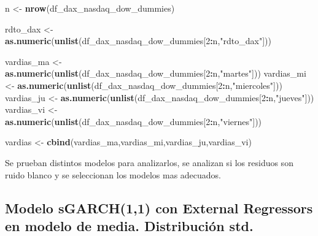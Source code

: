 \documentclass[
  11pt,
]{article}
\newenvironment{Shaded}{\begin{snugshade}}{\end{snugshade}}
\newcommand{\DecValTok}[1]{\textcolor[rgb]{0.00,0.00,0.81}{#1}}
\newcommand{\KeywordTok}[1]{\textcolor[rgb]{0.13,0.29,0.53}{\textbf{#1}}}
\newcommand{\NormalTok}[1]{#1}
\newcommand{\OperatorTok}[1]{\textcolor[rgb]{0.81,0.36,0.00}{\textbf{#1}}}
\newcommand{\StringTok}[1]{\textcolor[rgb]{0.31,0.60,0.02}{#1}}
\begin{document}
\begin{Shaded}
\begin{Highlighting}[]
\NormalTok{n <-}\StringTok{ }\KeywordTok{nrow}\NormalTok{(df_dax_nasdaq_dow_dummies)}

\NormalTok{rdto_dax <-}\StringTok{ }\KeywordTok{as.numeric}\NormalTok{(}\KeywordTok{unlist}\NormalTok{(df_dax_nasdaq_dow_dummies[}\DecValTok{2}\OperatorTok{:}\NormalTok{n,}\StringTok{"rdto_dax"}\NormalTok{]))}

\NormalTok{vardias_ma <-}\StringTok{ }\KeywordTok{as.numeric}\NormalTok{(}\KeywordTok{unlist}\NormalTok{(df_dax_nasdaq_dow_dummies[}\DecValTok{2}\OperatorTok{:}\NormalTok{n,}\StringTok{"martes"}\NormalTok{]))}
\NormalTok{vardias_mi <-}\StringTok{ }\KeywordTok{as.numeric}\NormalTok{(}\KeywordTok{unlist}\NormalTok{(df_dax_nasdaq_dow_dummies[}\DecValTok{2}\OperatorTok{:}\NormalTok{n,}\StringTok{"miercoles"}\NormalTok{]))}
\NormalTok{vardias_ju <-}\StringTok{ }\KeywordTok{as.numeric}\NormalTok{(}\KeywordTok{unlist}\NormalTok{(df_dax_nasdaq_dow_dummies[}\DecValTok{2}\OperatorTok{:}\NormalTok{n,}\StringTok{"jueves"}\NormalTok{]))}
\NormalTok{vardias_vi <-}\StringTok{ }\KeywordTok{as.numeric}\NormalTok{(}\KeywordTok{unlist}\NormalTok{(df_dax_nasdaq_dow_dummies[}\DecValTok{2}\OperatorTok{:}\NormalTok{n,}\StringTok{"viernes"}\NormalTok{]))}

\NormalTok{vardias <-}\StringTok{ }\KeywordTok{cbind}\NormalTok{(vardias_ma,vardias_mi,vardias_ju,vardias_vi)}
\end{Highlighting}
\end{Shaded}

Se prueban distintos modelos para analizarlos, se analizan si los
residuos son ruido blanco y se seleccionan los modelos mas adecuados.

\hypertarget{modelo-sgarch11-con-external-regressors-en-modelo-de-media.-distribuciuxf3n-std.}{%
\subsection{Modelo sGARCH(1,1) con External Regressors en modelo de
media. Distribución
std.}\label{modelo-sgarch11-con-external-regressors-en-modelo-de-media.-distribuciuxf3n-std.}}
\end{document}

